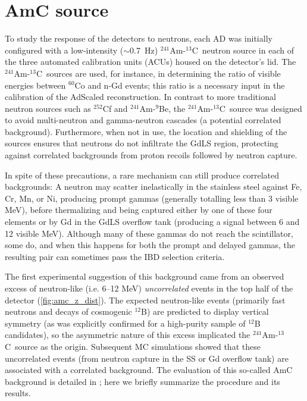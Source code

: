 \documentclass[../thesis.tex]{subfiles}
\begin{document}
\newcommand\AmC{$^{241}$Am-$^{13}$C}

\section{AmC source}
\label{sec:bkgAmC}

To study the response of the detectors to neutrons, each AD was initially configured with a low-intensity ($\sim$0.7~Hz) \AmC\ neutron source in each of the three automated calibration units (ACUs) housed on the detector's lid. The \AmC\ sources are used, for instance, in determining the ratio of visible energies between $^{60}$Co and n-Gd events; this ratio is a necessary input in the calibration of the AdScaled reconstruction. In contrast to more traditional neutron sources such as $^{252}$Cf and $^{241}$Am-$^{9}$Be, the \AmC\ source was designed to avoid multi-neutron and gamma-neutron cascades (a potential correlated background). Furthermore, when not in use, the location and shielding of the sources ensures that neutrons do not infiltrate the GdLS region, protecting against correlated backgrounds from proton recoils followed by neutron capture.

In spite of these precautions, a rare mechanism can still produce correlated backgrounds: A neutron may scatter inelastically in the stainless steel against Fe, Cr, Mn, or Ni, producing prompt gammas (generally totalling less than 3 visible MeV), before thermalizing and being captured either by one of these four elements or by Gd in the GdLS overflow tank (producing a signal between 6 and 12 visible MeV). Although many of these gammas do not reach the scintillator, some do, and when this happens for both the prompt and delayed gammas, the resulting pair can sometimes pass the IBD selection criteria.

The first experimental suggestion of this background came from an observed excess of neutron-like (i.e. 6--12 MeV) \emph{uncorrelated} events in the top half of the detector (\autoref{fig:amc_z_dist}). The expected neutron-like events (primarily fast neutrons and decays of cosmogenic $^{12}$B) are predicted to display vertical symmetry (as was explicitly confirmed for a high-purity sample of $^{12}$B candidates), so the asymmetric nature of this excess implicated the \AmC\ source as the origin. Subsequent MC simulations showed that these uncorrelated events (from neutron capture in the SS or Gd overflow tank) are associated with a correlated background. The evaluation of this so-called AmC background is detailed in \cite{Gu_2016}; here we briefly summarize the procedure and its results.
\end{document}
